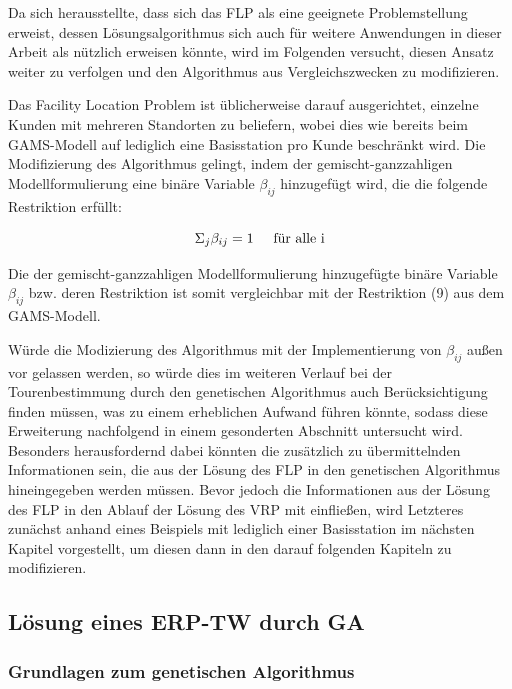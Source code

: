\documentclass[a4paper,12pt,parskip,bibtotoc,liststotoc]{article}
\begin{document}
Da sich herausstellte, dass sich das FLP als eine geeignete Problemstellung erweist, dessen Lösungsalgorithmus sich auch für weitere Anwendungen in dieser Arbeit als nützlich erweisen könnte, wird im Folgenden versucht, diesen Ansatz weiter zu verfolgen und den Algorithmus aus Vergleichszwecken zu modifizieren.

Das Facility Location Problem ist üblicherweise darauf ausgerichtet, einzelne Kunden mit mehreren Standorten zu beliefern, wobei dies wie bereits beim GAMS-Modell auf lediglich eine Basisstation pro Kunde beschränkt wird.
Die Modifizierung des Algorithmus gelingt, indem der gemischt-ganzzahligen Modellformulierung eine binäre Variable $\beta_{ij}$ hinzugefügt wird, die die folgende Restriktion erfüllt:


\begin{equation}
\Sigma_{j} \beta_{ij} = 1 \hspace{5mm}\text{für alle i}
\end{equation}


Die der gemischt-ganzzahligen Modellformulierung hinzugefügte binäre Variable $\beta_{ij}$ bzw. deren Restriktion ist somit vergleichbar mit der Restriktion (9) aus dem GAMS-Modell.

Würde die Modizierung des Algorithmus mit der Implementierung von $\beta_{ij}$ außen vor gelassen werden, so würde dies im weiteren Verlauf bei der Tourenbestimmung durch den genetischen Algorithmus auch Berücksichtigung finden müssen, was zu einem erheblichen Aufwand führen könnte, sodass diese Erweiterung nachfolgend in einem gesonderten Abschnitt untersucht wird.
Besonders herausfordernd dabei könnten die zusätzlich zu übermittelnden Informationen sein, die aus der Lösung des FLP in den genetischen Algorithmus hineingegeben werden müssen.
Bevor jedoch die Informationen aus der Lösung des FLP in den Ablauf der Lösung des VRP mit einfließen, wird Letzteres zunächst anhand eines Beispiels mit lediglich einer Basisstation im nächsten Kapitel vorgestellt, um diesen dann in den darauf folgenden Kapiteln zu modifizieren.


\subsection{Lösung eines ERP-TW durch GA}

\subsubsection{Grundlagen zum genetischen Algorithmus}
\end{document}
